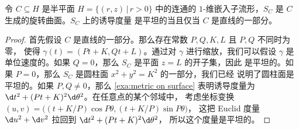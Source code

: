 \begin{proposition}[旋转曲面的平坦性判别]
  令 $C\subseteq H$ 是半平面 $H=\{(r,z)\,|\, r>0\}$ 中的连通的
  $1$-维嵌入子流形，$S_C$ 是 $C$ 生成的旋转曲面。$S_C$ 上的诱导度量
  是平坦的当且仅当 $C$ 是直线的一部分。
\end{proposition}
\begin{proof}
  首先假设 $C$ 是直线的一部分。那么存在常数 $P,Q,K,L$ 且 $P,Q$ 不同时为零，
  使得 $\gamma(t)=(Pt+K,Qt+L)$。通过对 $\gamma$ 进行缩放，我们可以假设 
  $\gamma$ 是单位速度的。如果 $Q=0$，那么 $S_C$ 是平面 $z=L$ 的开子集，因此
  是平坦的。如果 $P=0$，那么 $S_C$ 是圆柱面 $x^2+y^2=K^2$ 的一部分，我们已经
  说明了圆柱面是平坦的。如果 $P,Q\neq 0$，那么 \autoref{exa:metric on surface}
  表明诱导度量为 $\d t^2+(Pt+K)^2\d \theta^2$。在任意点的某个邻域中，
  考虑坐标变换 $(u,v)=\bigl((t+K/P)\cos P\theta,(t+K/P)\sin P\theta\bigr)$，
  这把 Euclid 度量 $\d u^2+\d v^2$ 拉回到 $\d t^2+(Pt+K)^2\d\theta^2$，
  所以这个度量是平坦的。


\end{proof}
